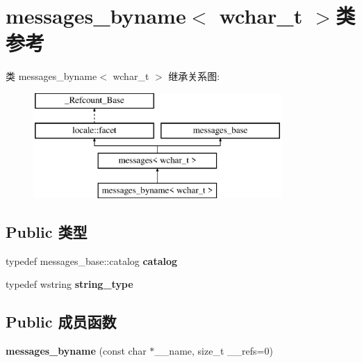 \hypertarget{classmessages__byname_3_01wchar__t_01_4}{}\section{messages\+\_\+byname$<$ wchar\+\_\+t $>$类 参考}
\label{classmessages__byname_3_01wchar__t_01_4}
类 messages\+\_\+byname$<$ wchar\+\_\+t $>$ 继承关系图\+:\begin{figure}[H]
\begin{center}
\leavevmode
\includegraphics[height=4.000000cm]{classmessages__byname_3_01wchar__t_01_4}
\end{center}
\end{figure}
\subsection*{Public 类型}
\begin{DoxyCompactItemize}
\item 
\mbox{\label{classmessages__byname_3_01wchar__t_01_4_a28a642e8ce81e44e3792d7b1e1988ea7}} 
typedef messages\+\_\+base\+::catalog {\bfseries catalog}
\item 
\mbox{\label{classmessages__byname_3_01wchar__t_01_4_a8a5324c78abdfcd53820777484efec8c}} 
typedef wstring {\bfseries string\+\_\+type}
\end{DoxyCompactItemize}
\subsection*{Public 成员函数}
\begin{DoxyCompactItemize}
\item 
\mbox{\label{classmessages__byname_3_01wchar__t_01_4_af425de75c0c1b751c9a763eaa8758eeb}} 
{\bfseries messages\+\_\+byname} (const char $\ast$\+\_\+\+\_\+name, size\+\_\+t \+\_\+\+\_\+refs=0)
\end{DoxyCompactItemize}
